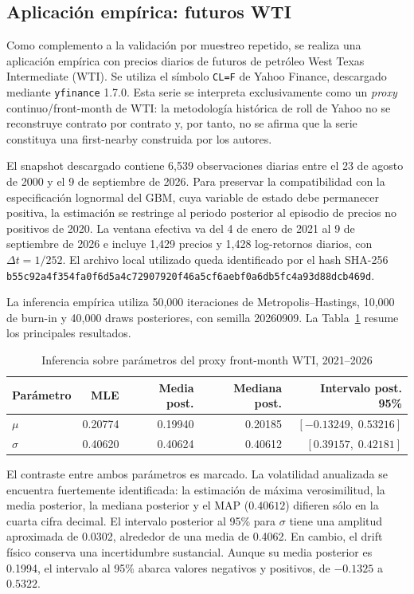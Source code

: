\subsection{Aplicación empírica: futuros WTI}
\label{subsec:wti_empirical}

Como complemento a la validación por muestreo repetido, se realiza una aplicación empírica con precios diarios de futuros de petróleo West Texas Intermediate (WTI). Se utiliza el símbolo \texttt{CL=F} de Yahoo Finance, descargado mediante \texttt{yfinance} 1.7.0. Esta serie se interpreta exclusivamente como un \emph{proxy} continuo/front-month de WTI: la metodología histórica de roll de Yahoo no se reconstruye contrato por contrato y, por tanto, no se afirma que la serie constituya una first-nearby construida por los autores.

El snapshot descargado contiene 6,539 observaciones diarias entre el 23 de agosto de 2000 y el 9 de septiembre de 2026. Para preservar la compatibilidad con la especificación lognormal del GBM, cuya variable de estado debe permanecer positiva, la estimación se restringe al periodo posterior al episodio de precios no positivos de 2020. La ventana efectiva va del 4 de enero de 2021 al 9 de septiembre de 2026 e incluye 1,429 precios y 1,428 log-retornos diarios, con $\Delta t=1/252$. El archivo local utilizado queda identificado por el hash SHA-256 \texttt{b55c92a4f354fa0f6d5a4c72907920f46a5cf6aebf0a6db5fc4a93d88dcb469d}.

La inferencia empírica utiliza 50,000 iteraciones de Metropolis--Hastings, 10,000 de burn-in y 40,000 draws posteriores, con semilla 20260909. La Tabla~\ref{tab:wti_posterior} resume los principales resultados.

\begin{table}[H]
\centering
\caption{Inferencia sobre parámetros del proxy front-month WTI, 2021--2026}
\label{tab:wti_posterior}
\begin{tabular}{lrrrr}
\toprule
Parámetro & MLE & Media post. & Mediana post. & Intervalo post. 95\% \\
\midrule
$\mu$ & 0.20774 & 0.19940 & 0.20185 & $[-0.13249,\;0.53216]$ \\
$\sigma$ & 0.40620 & 0.40624 & 0.40612 & $[0.39157,\;0.42181]$ \\
\bottomrule
\end{tabular}
\end{table}

El contraste entre ambos parámetros es marcado. La volatilidad anualizada se encuentra fuertemente identificada: la estimación de máxima verosimilitud, la media posterior, la mediana posterior y el MAP ($0.40612$) difieren sólo en la cuarta cifra decimal. El intervalo posterior al 95\% para $\sigma$ tiene una amplitud aproximada de 0.0302, alrededor de una media de 0.4062. En cambio, el drift físico conserva una incertidumbre sustancial. Aunque su media posterior es 0.1994, el intervalo al 95\% abarca valores negativos y positivos, de $-0.1325$ a $0.5322$.

